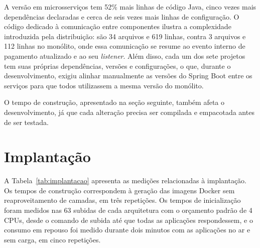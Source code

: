 A versão em microsserviços tem 52\% mais linhas de código Java, cinco vezes mais dependências
declaradas e cerca de seis vezes mais linhas de configuração. O código dedicado à comunicação
entre componentes ilustra a complexidade introduzida pela distribuição: são 34 arquivos e 619
linhas, contra 3 arquivos e 112 linhas no monólito, onde essa comunicação se resume ao evento
interno de pagamento atualizado e ao seu \textit{listener}. Além disso, cada um dos sete
projetos tem suas próprias dependências, versões e configurações, o que, durante o
desenvolvimento, exigiu alinhar manualmente as versões do Spring Boot entre os serviços para que
todos utilizassem a mesma versão do monólito.

O tempo de construção, apresentado na seção seguinte, também afeta o desenvolvimento, já que
cada alteração precisa ser compilada e empacotada antes de ser testada.

\section{Implantação}

A Tabela~\ref{tab:implantacao} apresenta as medições relacionadas à implantação. Os tempos de
construção correspondem à geração das imagens Docker sem reaproveitamento de camadas, em três
repetições. Os tempos de inicialização foram medidos nas 63 subidas de cada arquitetura com o
orçamento padrão de 4 CPUs, desde o comando de subida até que todas as aplicações
respondessem, e o consumo em repouso foi medido durante dois minutos com as aplicações no ar e
sem carga, em cinco repetições.

